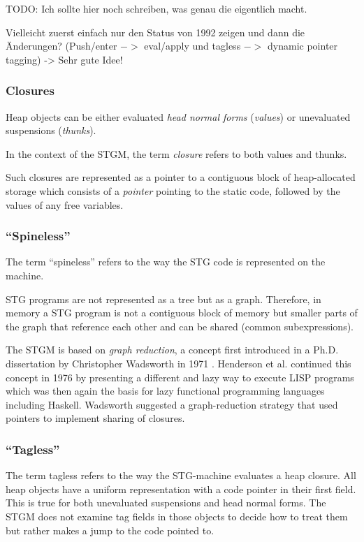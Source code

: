 \documentclass[runningheads]{llncs}
\begin{document}
TODO: Ich sollte hier noch schreiben, was genau die eigentlich macht.


Vielleicht zuerst einfach nur den Status von 1992 zeigen und dann die Änderungen? (Push/enter $->$ eval/apply und tagless $->$ dynamic pointer tagging)
-> Sehr gute Idee!

\cite{jones1992implementing}

\subsubsection{Closures}
Heap objects can be either evaluated \textit{head normal forms} (\textit{values}) or unevaluated suspensions (\textit{thunks}).

In the context of the STGM, the term \textit{closure} refers to both values and thunks.

Such closures are represented as a pointer to a contiguous block of heap-allocated storage which consists of a \textit{pointer} pointing to the static code, followed by the values of any free variables.


\subsubsection{\enquote{Spineless}}
The term \enquote{spineless} refers to the way the STG code is represented on the machine. 

STG programs are not represented as a tree but as a graph. Therefore, in memory a STG program is not a contiguous block of memory but smaller parts of the graph that reference each other and can be shared (common subexpressions).

The STGM is based on \textit{graph reduction}, a concept first introduced in a Ph.D. dissertation by Christopher Wadsworth in 1971 \cite{christopherwadsworth}. Henderson et al. continued this concept in 1976 by presenting a different and lazy way to execute LISP programs \cite{henderson1976lazy} which was then again the basis for lazy functional programming languages including Haskell. Wadsworth suggested a graph-reduction strategy that used pointers to implement sharing of closures.

\subsubsection{\enquote{Tagless}}
The term tagless refers to the way the STG-machine evaluates a heap closure.
All heap objects have a uniform representation with a code pointer in their first field. This is true for both unevaluated suspensions and head normal forms. The STGM does not examine tag fields in those objects to decide how to treat them but rather makes a jump to the code pointed to. \cite{jones1992implementing}
\end{document}
